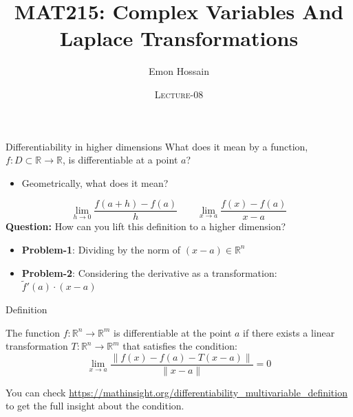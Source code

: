 \documentclass[11pt]{beamer}
\author[] %
{Emon Hossain\inst{1}}
\institute[University of Dhaka] %
{
  \inst{1}%
  Lecturer\\MNS department\\Brac University
}
\date[] %
{\textsc{Lecture-08}}
\title[]{MAT215: Complex Variables And Laplace Transformations}
\theoremstyle{plain}
\begin{document}
\begin{frame}
\titlepage
\end{frame}

\begin{frame}{Differentiability in higher dimensions}
    What does it mean by a function, $f:D\subset\mathbb R\rightarrow\mathbb R$, is differentiable at a point $a$? 
    \begin{itemize}
        \item Geometrically, what does it mean?
    \end{itemize}
    $$\boxed{\lim_{h\rightarrow 0}\frac{f(a+h)-f(a)}{h}}\qquad\boxed{\lim_{x\rightarrow a}\frac{f(x)-f(a)}{x-a}}$$
    \textbf{Question:} How can you lift this definition to a higher dimension? 
    \pause
    \begin{itemize}
        \item \textbf{Problem-1}: Dividing by the norm of $(x-a)\in\mathbb R^n$
        \item \textbf{Problem-2}: Considering the derivative as a transformation: $\tilde{f}'(a)\cdot(x-a)$ 
    \end{itemize}
\end{frame}
\begin{frame}{Definition}
    \begin{definition}
        The function $f:\mathbb R^n\rightarrow\mathbb R^m$ is differentiable at the point $a$ if there exists a linear transformation $T:\mathbb R^n\rightarrow\mathbb R^m$  that satisfies the condition:
        $$
        \boxed{\lim_{x\rightarrow a}\frac{\|f(x)-f(a)-T(x-a)\|}{\|x-a\|}=0}
        $$
    \end{definition}
    You can check \url{https://mathinsight.org/differentiability_multivariable_definition} to get the full insight about the condition. 
\end{frame}
\end{document}
